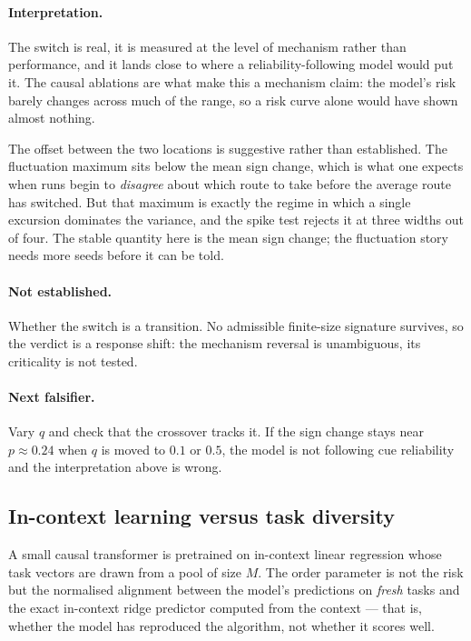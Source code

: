 \paragraph{Interpretation.}
The switch is real, it is measured at the level of mechanism rather than
performance, and it lands close to where a reliability-following model would
put it. The causal ablations are what make this a mechanism claim: the model's
risk barely changes across much of the range, so a risk curve alone would have
shown almost nothing.

The offset between the two locations is suggestive rather than established.
The fluctuation maximum sits below the mean sign change, which is what one
expects when runs begin to \emph{disagree} about which route to take before the
average route has switched. But that maximum is exactly the regime in
which a single excursion dominates the variance, and the spike test rejects it
at three widths out of four. The stable quantity here is the mean
sign change; the fluctuation story needs more seeds before it can be told.

\paragraph{Not established.}
Whether the switch is a transition. No admissible finite-size signature
survives, so the verdict is a response shift: the mechanism reversal is
unambiguous, its criticality is not tested.

\paragraph{Next falsifier.}
Vary $q$ and check that the crossover tracks it. If the sign change stays near
$p\approx0.24$ when $q$ is moved to $0.1$ or $0.5$, the model is not following
cue reliability and the interpretation above is wrong.

\subsection{In-context learning versus task diversity}

A small causal transformer is pretrained on in-context linear regression whose
task vectors are drawn from a pool of size $M$. The order parameter is not the
risk but the normalised alignment between the model's predictions on
\emph{fresh} tasks and the exact in-context ridge predictor computed from the
context --- that is, whether the model has reproduced the algorithm, not
whether it scores well.

